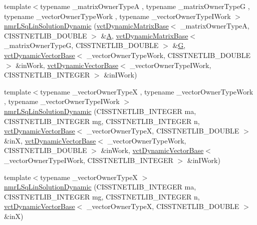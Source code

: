 \begin{DoxyCompactItemize}
\item 
{\footnotesize template$<$typename \+\_\+matrix\+Owner\+Type\+A , typename \+\_\+matrix\+Owner\+Type\+G , typename \+\_\+vector\+Owner\+Type\+Work , typename \+\_\+vector\+Owner\+Type\+I\+Work $>$ }\\\hyperlink{classnmr_l_sq_lin_solution_dynamic_a1b98a788d3543acaa6e223dfdb0b32d7}{nmr\+L\+Sq\+Lin\+Solution\+Dynamic} (\hyperlink{classvct_dynamic_matrix_base}{vct\+Dynamic\+Matrix\+Base}$<$ \+\_\+matrix\+Owner\+Type\+A, C\+I\+S\+S\+T\+N\+E\+T\+L\+I\+B\+\_\+\+D\+O\+U\+B\+L\+E $>$ \&\hyperlink{classnmr_l_sq_lin_solution_dynamic_aa4a41abac141e2e55dd5cafb59169dfd}{A}, \hyperlink{classvct_dynamic_matrix_base}{vct\+Dynamic\+Matrix\+Base}$<$ \+\_\+matrix\+Owner\+Type\+G, C\+I\+S\+S\+T\+N\+E\+T\+L\+I\+B\+\_\+\+D\+O\+U\+B\+L\+E $>$ \&\hyperlink{classnmr_l_sq_lin_solution_dynamic_a399cb314fb848d36f58c14830bad0c28}{G}, \hyperlink{classvct_dynamic_vector_base}{vct\+Dynamic\+Vector\+Base}$<$ \+\_\+vector\+Owner\+Type\+Work, C\+I\+S\+S\+T\+N\+E\+T\+L\+I\+B\+\_\+\+D\+O\+U\+B\+L\+E $>$ \&in\+Work, \hyperlink{classvct_dynamic_vector_base}{vct\+Dynamic\+Vector\+Base}$<$ \+\_\+vector\+Owner\+Type\+I\+Work, C\+I\+S\+S\+T\+N\+E\+T\+L\+I\+B\+\_\+\+I\+N\+T\+E\+G\+E\+R $>$ \&in\+I\+Work)
\item 
{\footnotesize template$<$typename \+\_\+vector\+Owner\+Type\+X , typename \+\_\+vector\+Owner\+Type\+Work , typename \+\_\+vector\+Owner\+Type\+I\+Work $>$ }\\\hyperlink{classnmr_l_sq_lin_solution_dynamic_a6aff6ec82ed0c3a79e76535b64b58808}{nmr\+L\+Sq\+Lin\+Solution\+Dynamic} (C\+I\+S\+S\+T\+N\+E\+T\+L\+I\+B\+\_\+\+I\+N\+T\+E\+G\+E\+R ma, C\+I\+S\+S\+T\+N\+E\+T\+L\+I\+B\+\_\+\+I\+N\+T\+E\+G\+E\+R mg, C\+I\+S\+S\+T\+N\+E\+T\+L\+I\+B\+\_\+\+I\+N\+T\+E\+G\+E\+R n, \hyperlink{classvct_dynamic_vector_base}{vct\+Dynamic\+Vector\+Base}$<$ \+\_\+vector\+Owner\+Type\+X, C\+I\+S\+S\+T\+N\+E\+T\+L\+I\+B\+\_\+\+D\+O\+U\+B\+L\+E $>$ \&in\+X, \hyperlink{classvct_dynamic_vector_base}{vct\+Dynamic\+Vector\+Base}$<$ \+\_\+vector\+Owner\+Type\+Work, C\+I\+S\+S\+T\+N\+E\+T\+L\+I\+B\+\_\+\+D\+O\+U\+B\+L\+E $>$ \&in\+Work, \hyperlink{classvct_dynamic_vector_base}{vct\+Dynamic\+Vector\+Base}$<$ \+\_\+vector\+Owner\+Type\+I\+Work, C\+I\+S\+S\+T\+N\+E\+T\+L\+I\+B\+\_\+\+I\+N\+T\+E\+G\+E\+R $>$ \&in\+I\+Work)
\item 
{\footnotesize template$<$typename \+\_\+vector\+Owner\+Type\+X $>$ }\\\hyperlink{classnmr_l_sq_lin_solution_dynamic_adcb539e3456408ee20ac0a02ba60ed0d}{nmr\+L\+Sq\+Lin\+Solution\+Dynamic} (C\+I\+S\+S\+T\+N\+E\+T\+L\+I\+B\+\_\+\+I\+N\+T\+E\+G\+E\+R ma, C\+I\+S\+S\+T\+N\+E\+T\+L\+I\+B\+\_\+\+I\+N\+T\+E\+G\+E\+R mg, C\+I\+S\+S\+T\+N\+E\+T\+L\+I\+B\+\_\+\+I\+N\+T\+E\+G\+E\+R n, \hyperlink{classvct_dynamic_vector_base}{vct\+Dynamic\+Vector\+Base}$<$ \+\_\+vector\+Owner\+Type\+X, C\+I\+S\+S\+T\+N\+E\+T\+L\+I\+B\+\_\+\+D\+O\+U\+B\+L\+E $>$ \&in\+X)

\end{DoxyCompactItemize}
